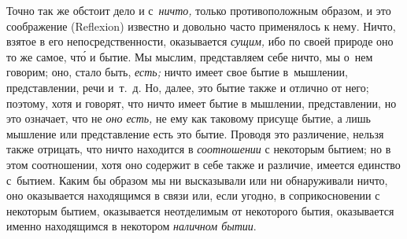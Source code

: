Точно так же обстоит дело и с~{\em ничто,} только противоположным образом,
и это соображение (Reflexion) известно и довольно часто применялось к нему.
Ничто, взятое в его непосредственности, оказывается {\em сущим,} ибо по своей
природе оно то же самое, чт\'{о} и бытие. Мы мыслим, представляем себе ничто,
мы о~нем говорим; оно, стало быть, {\em есть;} ничто имеет свое бытие
в~мышлении, представлении, речи и~т.~д. Но, далее, это бытие также и отлично от
него; поэтому, хотя и говорят, что ничто имеет бытие в мышлении, представлении,
но это означает, что не {\em оно есть,} не ему как таковому присуще бытие, а
лишь мышление или представление есть это бытие. Проводя это различение, нельзя
также отрицать, что ничто находится в {\em соотношении} с некоторым бытием; но
в этом соотношении, хотя оно содержит в себе также и различие, имеется единство
с~бытием. Каким бы образом мы ни высказывали или ни обнаруживали ничто, оно
оказывается находящимся в связи или, если угодно, в соприкосновении с некоторым
бытием, оказывается неотделимым от некоторого бытия, оказывается именно
находящимся в некотором {\em наличном бытии}.

